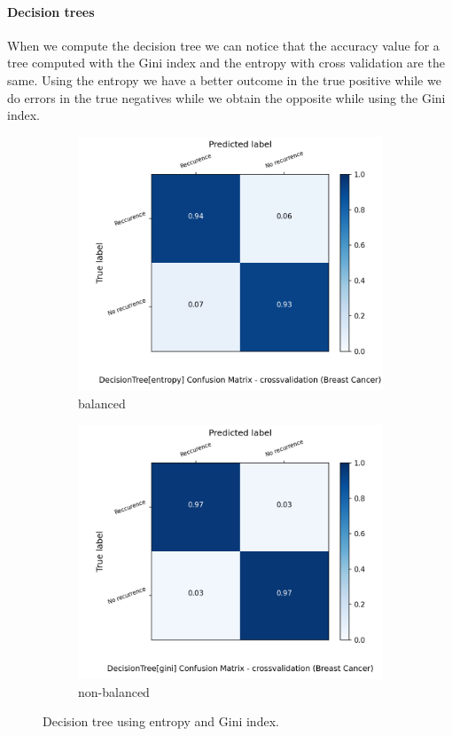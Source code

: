 \documentclass{article}
\begin{document}
\paragraph{Decision trees}
When we compute the decision tree we can notice that the  accuracy value for a tree computed with the Gini index and the entropy  with cross validation are the same. Using the entropy we have a better outcome in the true positive while we do errors in the true negatives while we obtain the opposite while using the Gini index.


\begin{figure}[H]
	\centering
	\begin{subfigure}{.5\textwidth}
		\centering
		\includegraphics[width=1.1\textwidth]{Plots/breastCancer_DecisionTree_entropy_balance_True_crossvalidation.png}
		\caption{balanced}
	\end{subfigure}%
	\begin{subfigure}{.5\textwidth}
		\centering
		\includegraphics[width=1.1\textwidth]{Plots/breastCancer_DecisionTree_gini_balance_True_crossvalidation.png}
		\caption{non-balanced}
	\end{subfigure}
	\caption{Decision tree using entropy and Gini index.}
\end{figure}
\end{document}
